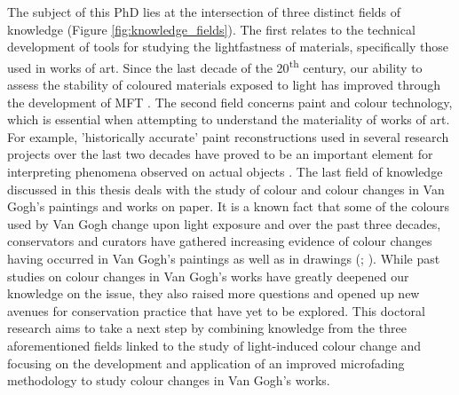 
The subject of this PhD lies at the intersection of three distinct fields of knowledge (Figure \ref{fig:knowledge_fields}). The first relates to the technical development of tools for studying the lightfastness of materials, specifically those used in works of art. Since the last decade of the 20\textsuperscript{th} century, our ability to assess the stability of coloured materials exposed to light has improved through the development of \gls{MFT} \citep{pretzel_determining_2000, whitmore_predicting_1999}. The second field concerns paint and colour technology, which is essential when attempting to understand the materiality of works of art. For example, 'historically accurate’ paint reconstructions used in several research projects over the last two decades have proved to be an important element for interpreting phenomena observed on actual objects \citep{carlyle_historically_2007}. The last field of knowledge discussed in this thesis deals with the study of colour and colour changes in Van Gogh's paintings and works on paper. It is a known fact that some of the colours used by Van Gogh change upon light exposure and over the past three decades, conservators and curators have gathered increasing evidence of colour changes having occurred in Van Gogh’s paintings \citep{hendriks_paintings_2016} as well as in drawings (\citealp{meedendorp_hand--hand_2013,shelley_technical_2005}; \citealp[428]{vellekoop_van_2013}). While past studies on colour changes in Van Gogh’s works have greatly deepened our knowledge on the issue, they also raised more questions and opened up new avenues for conservation practice that have yet to be explored. This doctoral research aims to take a next step by combining knowledge from the three aforementioned fields linked to the study of light-induced colour change and focusing on the development and application of an improved microfading methodology to study colour changes in Van Gogh's works. \\

